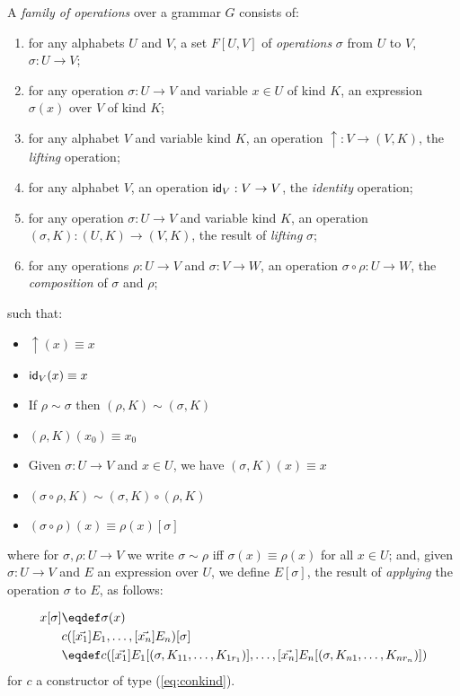 A \emph{family of operations} over a grammar $G$ consists of:
\begin{enumerate}
\item
for any alphabets $U$ and $V$, a set $F[U,V]$ of \emph{operations} $\sigma$ from $U$ to $V$, $\sigma : U \rightarrow V$;
\item
for any operation $\sigma : U \rightarrow V$ and variable $x \in U$ of kind $K$, an expression $\sigma(x)$ over $V$ of kind $K$;
\item
for any alphabet $V$ and variable kind $K$, an operation $\uparrow : V \rightarrow (V , K)$, the \emph{lifting} operation;
\item
for any alphabet $V$, an operation $\mathsf{id}_{V} : V \rightarrow V$, the \emph{identity} operation;
\item
for any operation $\sigma : U \rightarrow V$ and variable kind $K$, an operation $(\sigma , K) : (U , K) \rightarrow (V , K)$, the result of \emph{lifting} $\sigma$;
\item
for any operations $\rho : U \rightarrow V$ and $\sigma : V \rightarrow W$, an operation
$\sigma \circ \rho : U \rightarrow W$, the \emph{composition} of $\sigma$ and $\rho$;
\end{enumerate}
such that:
\begin{itemize}
\item
$\uparrow (x) \equiv x$
\item
$\mathsf{id}_{V}(x) \equiv x$
\item
If $\rho \sim \sigma$ then $(\rho , K) \sim (\sigma , K)$
\item
$(\rho , K)(x_0) \equiv x_0$
\item
Given $\sigma : U \rightarrow V$ and $x \in U$, we have $(\sigma , K)(x) \equiv x$
\item
$(\sigma \circ \rho , K) \sim (\sigma , K) \circ (\rho , K)$
\item
$(\sigma \circ \rho)(x) \equiv \rho(x) [ \sigma ]$
\end{itemize}
where for $\sigma, \rho : U \rightarrow V$ we write $\sigma \sim \rho$ iff $\sigma(x) \equiv \rho(x)$ for all $x \in U$; and, given $\sigma : U \rightarrow V$ and $E$ an expression over $U$, we define $E[\sigma]$, the result of \emph{applying} the operation $\sigma$ to $E$, as follows:

\begin{align*}
x[\sigma] & \eqdef \sigma(x) \\
\lefteqn{c([\vec{x_1}] E_1, \ldots, [\vec{x_n}] E_n) [\sigma]} \\
 & \eqdef
c([\vec{x_1}] E_1 [(\sigma , K_{11}, \ldots, K_{1r_1})], \ldots,
[\vec{x_n}] E_n [(\sigma, K_{n1}, \ldots, K_{nr_n})])
\end{align*}
for $c$ a constructor of type (\ref{eq:conkind}).

